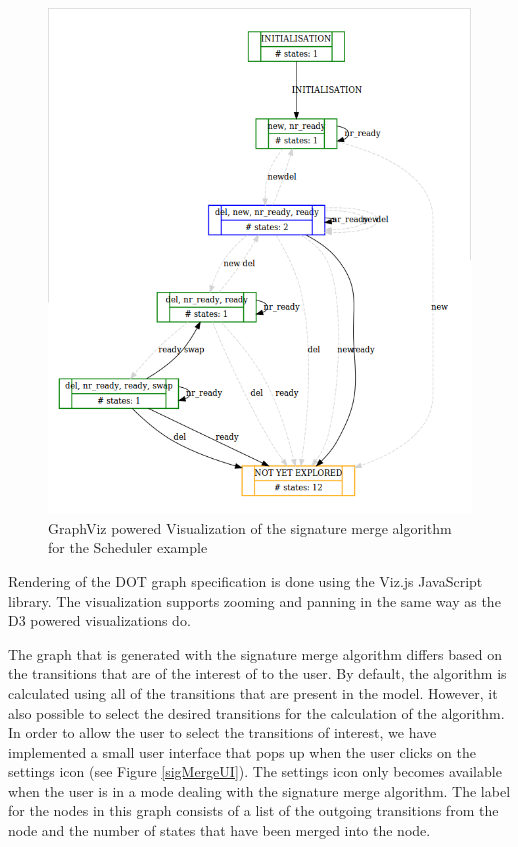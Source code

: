 \begin{center}
\begin{figure}[h!]
\centering
\includegraphics[width=14cm]{bilder/dotty-sigmerge.png}
\caption{GraphViz powered Visualization of the signature merge algorithm for the Scheduler example}
\label{sigmergeDotty}
\end{figure}
\end{center}

Rendering of the DOT graph specification is done using the Viz.js JavaScript library. The visualization supports zooming and panning in the same way as the D3 powered visualizations do.

The graph that is generated with the signature merge algorithm differs based on the transitions that are of the interest of to the user. By default, the algorithm is calculated using all of the transitions that are present in the model. However, it also possible to select the desired transitions for the calculation of the algorithm. In order to allow the user to select the transitions of interest, we have implemented a small user interface that pops up when the user clicks on the settings icon (see Figure \ref{sigMergeUI}). The settings icon only becomes available when the user is in a mode dealing with the signature merge algorithm. The label for the nodes in this graph consists of a list of the outgoing transitions from the node and the number of states that have been merged into the node.  

